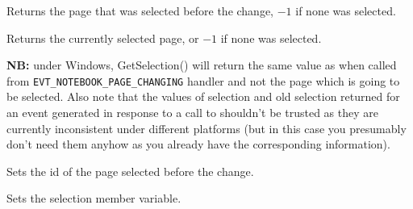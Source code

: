 Returns the page that was selected before the change, $-1$ if none was selected.


\label{wxnotebookeventgetselection}


Returns the currently selected page, or $-1$ if none was selected.

{\bf NB:} under Windows, GetSelection() will return the same value as\rtfsp
{} when called from
{\tt EVT\_NOTEBOOK\_PAGE\_CHANGING} handler and not the page which is going to
be selected. Also note that the values of selection and old selection returned
for an event generated in response to a call to 
 shouldn't be trusted
as they are currently inconsistent under different platforms (but in this case
you presumably don't need them anyhow as you already have the corresponding
information).


\label{wxnotebookeventsetoldselection}


Sets the id of the page selected before the change.


\label{wxnotebookeventsetselection}


Sets the selection member variable.




